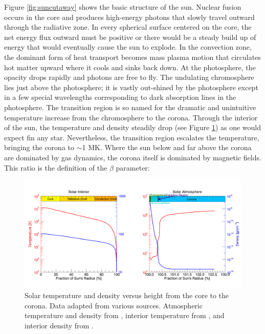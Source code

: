 Figure \ref{fig:suncutaway} shows the basic structure of the sun. Nuclear fusion occurs in the core and produces high-energy photons that slowly travel outward through the radiative zone. In every spherical surface centered on the core, the net energy flux outward must be positive or there would be a steady build up of energy that would eventually cause the sun to explode. In the convection zone, the dominant form of heat transport becomes mass plasma motion that circulates hot matter upward where it cools and sinks back down. At the photosphere, the opacity drops rapidly and photons are free to fly. The undulating chromosphere lies just above the photosphere; it is vastly out-shined by the photosphere except in a few special wavelengths corresponding to dark absorption lines in the photosphere. The transition region is so named for the dramatic and unintuitive temperature increase from the chromosphere to the corona. Through the interior of the sun, the temperature and density steadily drop (see Figure \ref{fig:suntemperaturedensity}) as one would expect fin any star. Nevertheless, the transition region escalates the temperature, bringing the corona to $\sim$1 MK. Where the sun below and far above the corona are dominated by gas dynamics, the corona itself is dominated by magnetic fields. This ratio is the definition of the $\beta$ parameter:

\begin{figure}[!h]
    \begin{center}
	    \includegraphics[width=\textwidth]{Images/SolarTemperatureAndDensity.png}
    \end{center}
    \caption[Solar temperature and density versus height]{
        Solar temperature and density versus height from the core to the corona. Data adapted
        from various sources. Atmospheric temperature and density from \citet{Eddy1979}, 
        interior temperature from \citet{Lang2001}, and interior density from  
        \citet{Christensen-Dalsgaard1996}.         
    }
    \label{fig:suntemperaturedensity}
\end{figure}

